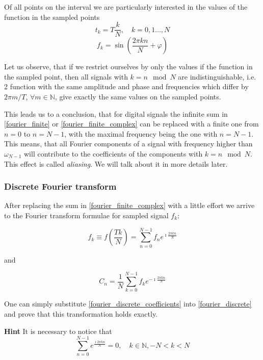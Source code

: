 \documentclass[11pt]{book}
\begin{document}
Of all points on the interval we are particularly interested in the values of the function in the sampled points 
$$
t_k = T\frac{k}{N},\quad k = 0,1\ldots, N
$$\begin{equation}
f_k = \sin\left({\frac{2 \pi k n}{N}} + \varphi\right)
\end{equation}

Let us observe, that if we restrict ourselves by only the values if the function in the sampled point, then all signals with $ k = n \mod N$ are indistinguishable, i.e. 2 function with the same amplitude and phase and frequencies which differ by $ 2 \pi m / T$, $\forall m \in \mathbb{N}$, give exactly the same values on the sampled points. 

This leads us to a conclusion, that for digital signals the infinite sum in \eqref{fourier_finite} or \eqref{fourier_finite_complex} can be replaced with a finite one from $n=0$ to $n=N-1$, with the maximal frequency being the one with $n=N-1$. This means, that all Fourier components of a signal with frequency higher than $\omega_{N-1}$ will contribute to the coefficients of the components with $ k  = n \mod N$. This effect is called {\it aliasing}. We will talk about it in more details later.


\subsubsection{Discrete Fourier transform}

After replacing the sum in \eqref{fourier_finite_complex} with a little effort we arrive to the Fourier transform formulae for sampled signal $f_k$:

\begin{equation}
f_k \equiv f\left(\frac{Tk}{N}\right) = \sum\limits_{n = 0}^{N-1} f_n e^{\imath \frac{2 \pi k n}{N} }\label{fourier_discrete}
\end{equation}

and 

\begin{equation}
C_n = \frac{1}{N} \sum\limits_{k = 0}^{N-1} f_k e^{-\imath \frac{2 \pi k n}{N} }\label{fourier_discrete_coefficients}
\end{equation}

One can simply substitute \eqref{fourier_discrete_coefficients} into \eqref{fourier_discrete} and prove that this transformation holds exactly.

{\bf Hint} It is necessary to notice that
\begin{equation}
\sum\limits_{n=0}^{N-1} e^{\frac{\imath 2 \pi k n}{N}} = 0, \quad k \in \mathbb{N}, -N < k < N
\end{equation}
\end{document}
